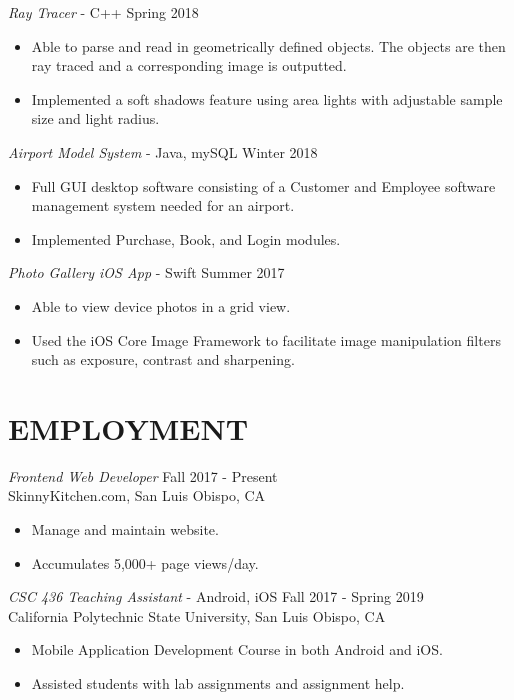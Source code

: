 \documentclass[margin]{res}
\begin{document}
\begin{resume}
                {\sl Ray Tracer} - C++ \hfill            Spring 2018
                 \begin{itemize}  \itemsep -2pt %
                 \item Able to parse and read in geometrically defined objects. The objects are then ray traced and a corresponding image is outputted.
                 \item Implemented a soft shadows feature using area lights with adjustable sample size and light radius.
                 \end{itemize}

                {\sl Airport Model System} - Java, mySQL \hfill        Winter 2018
                  \begin{itemize}
                   \item Full GUI desktop software consisting of a Customer and Employee software management system needed for an airport.
                   \item Implemented Purchase, Book, and Login modules.
                   \end{itemize}

                {\sl Photo Gallery iOS App} - Swift \hfill            Summer 2017
                 \begin{itemize}  \itemsep -2pt %
                 \item Able to view device photos in a grid view.
                 \item Used the iOS Core Image Framework to facilitate image manipulation filters such as exposure, contrast and sharpening.
                 \end{itemize}

\section{EMPLOYMENT} {\sl Frontend Web Developer} \hfill Fall 2017 - Present \\
                SkinnyKitchen.com, San Luis Obispo, CA
                 \begin{itemize}  \itemsep -2pt %
                 \item Manage and maintain website.
                \item Accumulates 5,000+ page views/day.
                \end{itemize}

                {\sl CSC 436 Teaching Assistant} - Android, iOS \hfill Fall 2017 - Spring 2019 \\
                California Polytechnic State University, San Luis Obispo, CA
                 \begin{itemize}  \itemsep -2pt %
                 \item Mobile Application Development Course in both Android and iOS.
                 \item Assisted students with lab assignments and assignment help.
                \end{itemize}



\end{resume}
\end{document}
